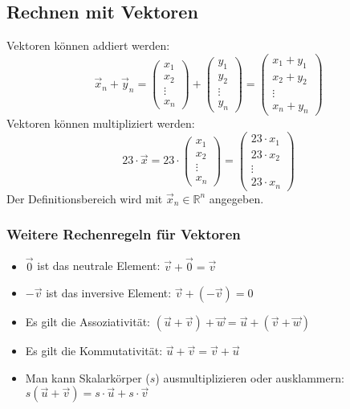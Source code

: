\subsection{Rechnen mit Vektoren}
Vektoren können addiert werden:
\[ \vec x_n + \vec y_n =
  \left( \begin {array} {c} x_1 \\ x_2 \\ \vdots \\ x_n \end {array}
  \right) +
    \left( \begin {array} {c} y_1 \\ y_2 \\ \vdots \\ y_n \end {array}
    \right) = 
    \left( \begin {array} {c} x_1 + y_1 \\ x_2 + y_2 \\ \vdots \\ x_n + y_n \end {array} \right) \]
Vektoren können multipliziert werden:
\[
23 \cdot \vec x = 23 \cdot
  \left( \begin {array} {c} x_1 \\ x_2 \\ \vdots \\ x_n \end {array}
  \right) = 
    \left( \begin {array} {c} 23 \cdot x_1 \\ 23 \cdot x_2 \\ \vdots
    \\ 23 \cdot x_n \end {array} \right)
\]
Der Definitionsbereich wird mit $\vec x_n \in \mathbb{R}^n$ angegeben.

\subsubsection{Weitere Rechenregeln für Vektoren}
\begin{itemize}
  \item $\vec 0$ ist das neutrale Element: $\vec v + \vec 0 = \vec v$
  \item $- \vec v$ ist das inversive Element: $\vec v + (- \vec v) = 0$
  \item Es gilt die Assoziativität: $(\vec u + \vec v ) + \vec w = \vec u + (\vec v + \vec w)$
  \item Es gilt die Kommutativität: $\vec u + \vec v = \vec v + \vec u$
  \item Man kann Skalarkörper ($s$) ausmultiplizieren oder ausklammern:
    $s (\vec u + \vec v) = s \cdot \vec u + s \cdot \vec v$
\end{itemize}

